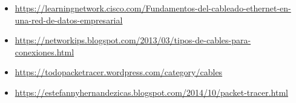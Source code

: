 \documentclass{article}
\begin{document}
\begin{itemize}
    \item \href{https://learningnetwork.cisco.com/s/article/Fundamentos-del-cableado-ethernet-en-una-red-de-datos-empresarial}{https://learningnetwork.cisco.com/Fundamentos-del-cableado-ethernet-en-una-red-de-datos-empresarial}
    \item \href{https://networkips.blogspot.com/2013/03/tipos-de-cables-para-conexiones.html}{https://networkips.blogspot.com/2013/03/tipos-de-cables-para-conexiones.html}
    \item \href{https://todopacketracer.wordpress.com/category/cables/#:~:text=Crossover%20cable%20%2C%20Straight%20cable%2C%20rollover,y%20escuchan%20por%20cable%203.}{https://todopacketracer.wordpress.com/category/cables}
    \item \href{https://estefannyhernandezicas.blogspot.com/2014/10/packet-tracer.html}{https://estefannyhernandezicas.blogspot.com/2014/10/packet-tracer.html}
\end{itemize}
\end{document}
